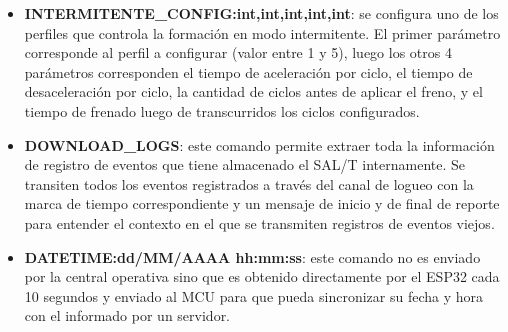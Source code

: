 \begin{itemize}
    \item \textbf{INTERMITENTE\_CONFIG:int,int,int,int,int}: se configura uno de los perfiles que controla la formación en modo intermitente. El primer parámetro corresponde al perfil a configurar (valor entre 1 y 5), luego los otros 4 parámetros corresponden el tiempo de aceleración por ciclo, el tiempo de desaceleración por ciclo, la cantidad de ciclos antes de aplicar el freno, y el tiempo de frenado luego de transcurridos los ciclos configurados. 
    
    \item \textbf{DOWNLOAD\_LOGS}: este comando permite extraer toda la información de registro de eventos que tiene almacenado el SAL/T internamente. Se transiten todos los eventos registrados a través del canal de logueo con la marca de tiempo correspondiente y un mensaje de inicio y de final de reporte para entender el contexto en el que se transmiten registros de eventos viejos. 
    
    \item \textbf{DATETIME:dd/MM/AAAA hh:mm:ss}: este comando no es enviado por la central operativa sino que es obtenido directamente por el ESP32 cada 10 segundos y enviado al MCU para que pueda sincronizar su fecha y hora con el informado por un servidor. 


\end{itemize}
